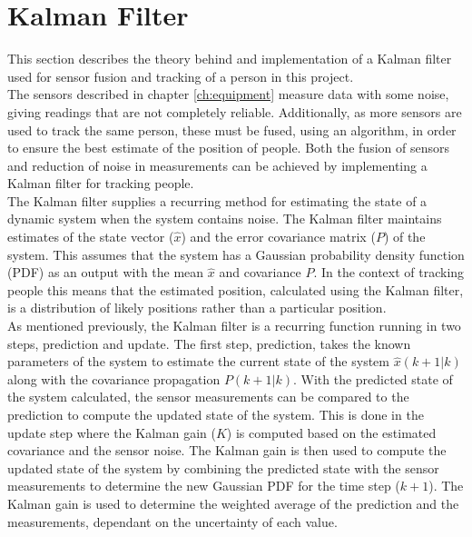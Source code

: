\section{Kalman Filter} \label{sec:KalmanFilter}
This section describes the theory behind and implementation of a Kalman filter used for sensor fusion and tracking of a person in this project.\\

The sensors described in chapter \ref{ch:equipment} measure data with some noise, giving readings that are not completely reliable. Additionally, as more sensors are used to track the same person, these must be fused, using an algorithm, in order to ensure the best estimate of the position of people. Both the fusion of sensors and reduction of noise in measurements can be achieved by implementing a Kalman filter for tracking people.\\

The Kalman filter supplies a recurring method for estimating the state of a dynamic system when the system contains noise. The Kalman filter maintains estimates of the state vector ($\hat{x}$) and the error covariance matrix ($P$) of the system. This assumes that the system has a Gaussian probability density function (PDF) as an output with the mean $\hat{x}$ and covariance $P$. In the context of tracking people this means that the estimated position, calculated using the Kalman filter, is a distribution of likely positions rather than a particular position.\\


As mentioned previously, the Kalman filter is a recurring function running in two steps, prediction and update. The first step, prediction, takes the known parameters of the system to estimate the current state of the system $\hat{x}(k+1|k)$ along with the covariance propagation $P(k+1|k)$. With the predicted state of the system calculated, the sensor measurements can be compared to the prediction to compute the updated state of the system. This is done in the update step where the Kalman gain ($K$) is computed based on the estimated covariance and the sensor noise. The Kalman gain is then used to compute the updated state of the system by combining the predicted state with the sensor measurements to determine the new Gaussian PDF for the time step ($k+1$). The Kalman gain is used to determine the weighted average of the prediction and the measurements, dependant on the uncertainty of each value.\cite{choset2005principles}

